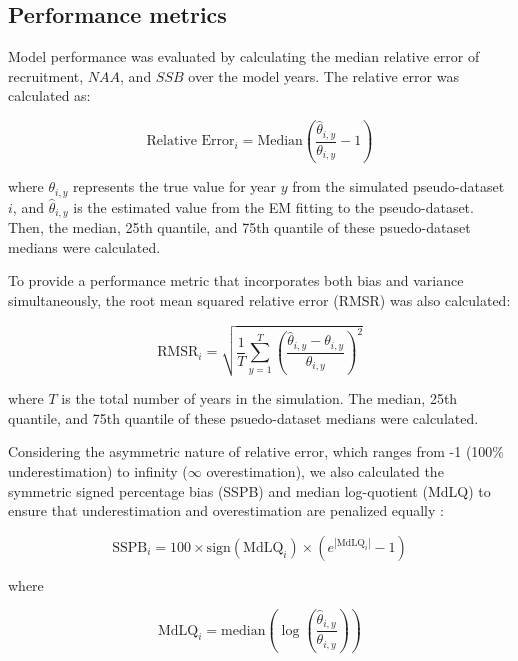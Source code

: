 \documentclass[
  12pt,
]{article}
\begin{document}
\subsection{Performance metrics}\label{performance-metrics}

Model performance was evaluated by calculating the median relative error
of recruitment, \(NAA\), and \(SSB\) over the model years. The relative
error was calculated as:

\begin{equation}
\text{Relative Error}_{i} = \text{Median} \left( \frac{\hat{\theta}_{i,y}}{\theta_{i,y}} - 1 \right)
\end{equation}

where \(\theta_{i,y}\) represents the true value for year \(y\) from the
simulated pseudo-dataset \(i\), and \(\hat{\theta}_{i,y}\) is the
estimated value from the EM fitting to the pseudo-dataset. Then, the
median, 25th quantile, and 75th quantile of these psuedo-dataset medians
were calculated.

To provide a performance metric that incorporates both bias and variance
simultaneously, the root mean squared relative error (RMSR) was also
calculated:

\begin{equation}
\text{RMSR}_{i} = \sqrt{ \frac{1}{T} \sum_{y=1}^{T} \left( \frac{\hat{\theta}_{i,y} - \theta_{i,y}}{\theta_{i,y}} \right)^2 }
\end{equation}

where \(T\) is the total number of years in the simulation. The median,
25th quantile, and 75th quantile of these psuedo-dataset medians were
calculated.

Considering the asymmetric nature of relative error, which ranges from
-1 (100\% underestimation) to infinity (\(\infty\) overestimation), we
also calculated the symmetric signed percentage bias (SSPB) and median
log-quotient (MdLQ) to ensure that underestimation and overestimation
are penalized equally \citep{Morley2018}:

\begin{equation}
\text{SSPB}_{i} = 100 \times \text{sign}(\text{MdLQ}_{i}) \times \left( e^{|\text{MdLQ}_{i}|} - 1 \right)
\end{equation}

where

\begin{equation}
\text{MdLQ}_{i} = \text{median}\left( \log \left( \frac{\hat{\theta}_{i,y}}{\theta_{i,y}} \right) \right)
\end{equation}
\end{document}
